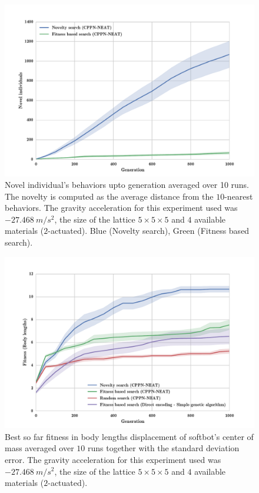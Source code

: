 \begin{figure}
\centering
\includegraphics[width=1.0\textwidth]{Figures/Results/novelIndividualsFitNovComp.pdf}
\caption{Novel individual's behaviors upto generation averaged over 10 runs. The novelty is computed as the average distance from the $10$-nearest behaviors. The gravity acceleration for this experiment used was $-27.468\   m/s^2$, the size of the lattice $5\times 5\times5$ and $4$ available materials ($2$-actuated). Blue (Novelty search), Green (Fitness based search).}
\label{fig:ViolinPlotsAvgGenFitSize5}
\end{figure}



\begin{figure}
\centering
\includegraphics[width=1.0\textwidth]{Figures/Results/FitNovRandomDirectSize5.pdf}
\caption{Best so far fitness in body lengths displacement of softbot's center of mass averaged over $10$ runs together with the standard deviation error. The gravity acceleration for this experiment used was $-27.468\   m/s^2$, the size of the lattice $5\times 5\times5$ and $4$ available materials ($2$-actuated).}
\label{fig:FitNovRandomDirectSize5}
\end{figure}

